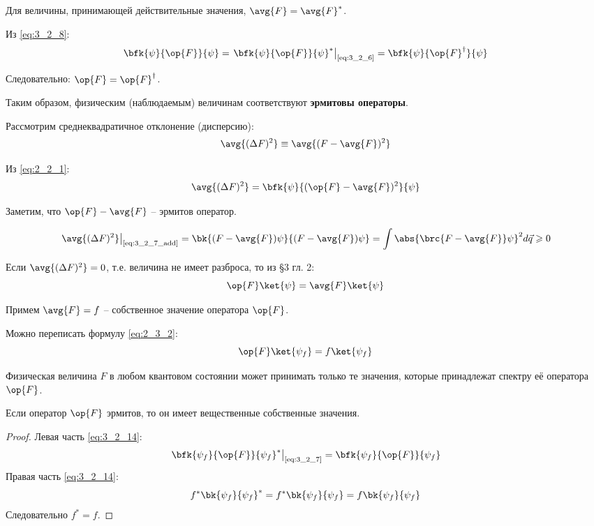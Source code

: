 Для величины, принимающей действительные значения, $\avg{F} = \avg{F}^*$.

Из \eqref{eq:3_2_8}:
\begin{equation}
\label{eq:3_2_9}
\bfk{\psi}{\op{F}}{\psi} = \left .\bfk{\psi}{\op{F}}{\psi}^* \right|_{\text{\eqref{eq:3_2_6}}} = \bfk{\psi}{\op{F}^\dag}{\psi}
\end{equation}

Следовательно: $\op{F} = \op{F}^\dag$.

Таким образом, физическим (наблюдаемым) величинам соответствуют \textbf{эрмитовы операторы}.

Рассмотрим среднеквадратичное отклонение (дисперсию):
\begin{equation}
\label{eq:3_2_10}
\avg{(\Delta F)^2} \equiv \avg{(F - \avg{F})^2}
\end{equation}

Из \eqref{eq:2_2_1}:
\begin{equation}
\label{eq:3_2_11}
\avg{(\Delta F)^2} = \bfk{\psi}{(\op{F} - \avg{F})^2}{\psi}
\end{equation}

Заметим, что $\op{F} - \avg{F}$ -- эрмитов оператор.

\begin{equation}
\label{eq:3_2_12}
\left. \avg{(\Delta F)^2} \right|_{\text{\eqref{eq:3_2_7_add}}} = \bk{(F - \avg{F})\psi}{(F - \avg{F})\psi} = \int \abs{\brc{F - \avg{F}}\psi}^2 d\vec{q} \geqslant 0
\end{equation}

Если $\avg{(\Delta F)^2} = 0$, т.е. величина не имеет разброса, то из \S 3 гл. 2:
\begin{equation}
\label{eq:3_2_13}
\op{F}\ket{\psi} = \avg{F}\ket{\psi}
\end{equation}

Примем $\avg{F} = f$ -- собственное значение оператора $\op{F}$.

Можно переписать формулу \eqref{eq:2_3_2}:
\begin{equation}
\label{eq:3_2_14}
\op{F}\ket{\psi_{f}} = f \ket{\psi_{f}}
\end{equation}

\begin{stmt}
Физическая величина $F$ в любом квантовом состоянии может принимать только те значения, которые принадлежат спектру её оператора $\op{F}$.
\end{stmt}

\begin{thm}
Если оператор $\op{F}$ эрмитов, то он имеет вещественные собственные значения.
\end{thm}
\begin{proof}
Левая часть \eqref{eq:3_2_14}:
$$
\left. \bfk{\psi_f}{\op{F}}{\psi_f}^* \right|_{\text{\eqref{eq:3_2_7}}} = \bfk{\psi_f}{\op{F}}{\psi_f}
$$
Правая часть \eqref{eq:3_2_14}:
$$
f^*\bk{\psi_f}{\psi_f}^* = f^* \bk{\psi_f}{\psi_f} = f\bk{\psi_f}{\psi_f}
$$
Следовательно $\boxed{f^* = f}$.
\end{proof}

